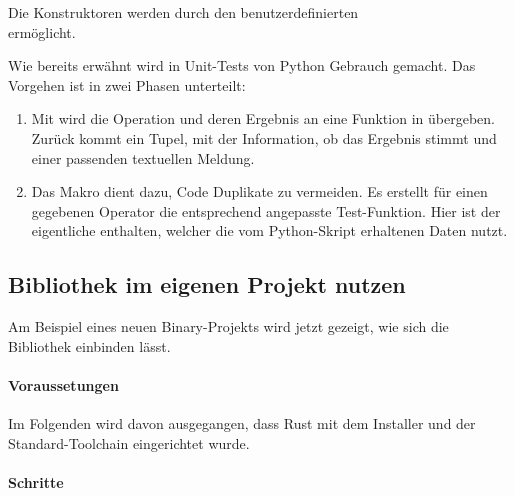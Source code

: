             Die  Konstruktoren werden durch den benutzerdefinierten \\  ermöglicht.

            Wie bereits erwähnt wird in Unit-Tests von Python Gebrauch gemacht. Das Vorgehen ist in zwei Phasen unterteilt:
            \begin{enumerate}
                \item Mit  wird die Operation und deren Ergebnis an eine Funktion in  übergeben. Zurück kommt ein Tupel, mit der Information, ob das Ergebnis stimmt und einer passenden textuellen Meldung.

                \item Das Makro  dient dazu, Code Duplikate zu vermeiden. Es erstellt für einen gegebenen Operator die entsprechend angepasste Test-Funktion. Hier ist der eigentliche  enthalten, welcher die vom Python-Skript erhaltenen Daten nutzt.
            \end{enumerate}


    \subsection{Bibliothek im eigenen Projekt nutzen} \label{sec:eigenesprojekt}
        Am Beispiel eines neuen Binary-Projekts wird jetzt gezeigt, wie sich die Bibliothek einbinden lässt.

        \paragraph*{Voraussetungen}
        Im Folgenden wird davon ausgegangen, dass Rust mit dem \href{https://rustup.rs}{} Installer und der Standard-Toolchain eingerichtet wurde.

        \paragraph*{Schritte}

